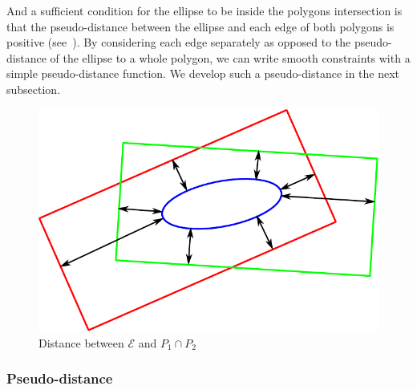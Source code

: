 And a sufficient condition for the ellipse to be inside the polygons intersection is that the pseudo-distance between the ellipse and each edge of both polygons is positive (see~).
By considering each edge separately as opposed to the pseudo-distance of the ellipse to a whole polygon, we can write smooth constraints with a simple pseudo-distance function.
We develop such a pseudo-distance in the next subsection.
%
\begin{figure}[!htb]
  \centering
  \includegraphics[width=0.4\columnwidth]{distance.pdf}
  \caption{Distance between $\mathcal{E}$ and $P_1 \cap P_2$}
\label{fig:distance}
\end{figure}

\subsubsection{Pseudo-distance}
\label{subsubsec:formulation}

